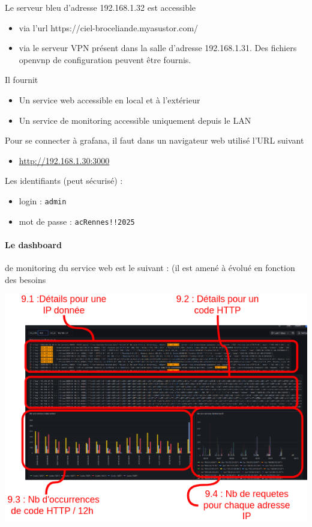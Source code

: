 \documentclass[french, 12pt]{article}%
\newcommand{\itemE}{\item[$\bullet$]}
\begin{document}
Le serveur bleu d'adresse 192.168.1.32 est accessible 
\begin{itemize}
\itemE via l'url https://ciel-broceliande.myasustor.com/
\itemE via le serveur VPN présent dans la salle d'adresse 192.168.1.31. Des fichiers openvnp de configuration peuvent être fournis.
\end{itemize}
Il fournit 
\begin{itemize}
\itemE Un service web accessible en local et à l'extérieur 
\itemE Un service de monitoring accessible uniquement depuis le LAN
\end{itemize}

\vspace{0.5cm}
Pour se connecter à grafana, il faut dans un navigateur web utilisé l'URL suivant  
\begin{itemize}
\itemE \url{http://192.168.1.30:3000}
\end{itemize}


\vspace{0.5cm}
Les identifiants (peut sécurisé) : 
\begin{itemize}
\itemE login : \verb?admin?
\itemE mot de passe : \verb?acRennes!!2025?
\end{itemize}

\paragraph{Le dashboard} de monitoring du service web est le suivant : (il est amené à évolué en fonction des besoins

\begin{center}
\includegraphics[scale=0.7]{./ressource/exempleRelle.drawio.png}
\end{center}
\end{document}
